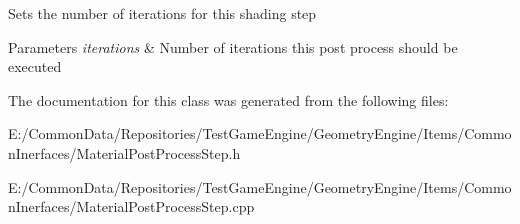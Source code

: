 Sets the number of iterations for this shading step 
\begin{DoxyParams}{Parameters}
{\em iterations} & Number of iterations this post process should be executed \\
\hline
\end{DoxyParams}


The documentation for this class was generated from the following files\+:\begin{DoxyCompactItemize}
\item 
E\+:/\+Common\+Data/\+Repositories/\+Test\+Game\+Engine/\+Geometry\+Engine/\+Items/\+Common\+Inerfaces/Material\+Post\+Process\+Step.\+h\item 
E\+:/\+Common\+Data/\+Repositories/\+Test\+Game\+Engine/\+Geometry\+Engine/\+Items/\+Common\+Inerfaces/Material\+Post\+Process\+Step.\+cpp\end{DoxyCompactItemize}
